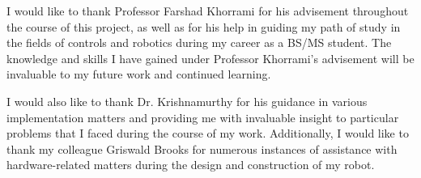 \clearpage
\vspace*{\fill}
	\begin{center}
		\begin{minipage}{\textwidth}
			I would like to thank Professor Farshad Khorrami for his advisement throughout the course of this project, as well as for his help in guiding my path of study in the fields of controls and robotics during my career as a BS/MS student. The knowledge and skills I have gained under Professor Khorrami's advisement will be invaluable to my future work and continued learning. %
			
			\vspace{5mm}
			\hspace{5mm} 
			I would also like to thank Dr. Krishnamurthy for his guidance in various implementation matters and providing me with invaluable insight to particular problems that I faced during the course of my work. Additionally, I would like to thank my colleague Griswald Brooks for numerous instances of assistance with hardware-related matters during the design and construction of my robot. 
		\end{minipage}
	\end{center}
\vfill %
\clearpage
